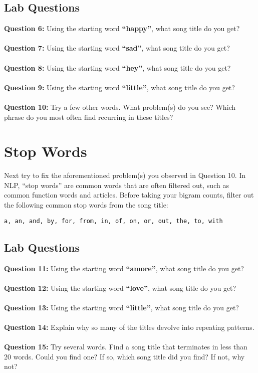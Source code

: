 \documentclass{article}
\begin{document}
\begin{tcolorbox}
 \section*{Lab Questions}
 \textbf{Question 6:} Using the starting word \textbf{``happy''}, what song title do you get?
 \\\\
 \textbf{Question 7:} Using the starting word \textbf{``sad''}, what song title do you get?
 \\\\
 \textbf{Question 8:} Using the starting word \textbf{``hey''}, what song title do you get?
 \\\\
 \textbf{Question 9:} Using the starting word \textbf{``little''}, what song title do you get?
 \\\\
 \textbf{Question 10:} Try a few other words. What problem(s) do you see? Which phrase do you most often find recurring in these titles?
  
\end{tcolorbox}


\section*{Stop Words}
Next try to fix the aforementioned problem(s) you observed in Question 10. In NLP, ``stop words'' are common words that are often filtered out, such as common function words and articles. Before taking your bigram counts, filter out the following common stop words from the song title:
\begin{center}
 \verb|a, an, and, by, for, from, in, of, on, or, out, the, to, with|
\end{center}

\begin{tcolorbox}
 \section*{Lab Questions}
 \textbf{Question 11:} Using the starting word \textbf{``amore''}, what song title do you get?
 \\\\
 \textbf{Question 12:} Using the starting word \textbf{``love''}, what song title do you get?
 \\\\
 \textbf{Question 13:} Using the starting word \textbf{``little''}, what song title do you get?
 \\\\
 \textbf{Question 14:} Explain why so many of the titles devolve into repeating patterns.
 \\\\
 \textbf{Question 15:} Try several words. Find a song title that terminates in less than 20 words. Could you find one? If so, which song title did you find? If not, why not?
  
\end{tcolorbox}
\end{document}
